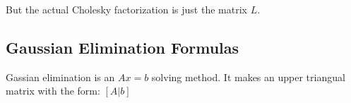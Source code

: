 But the actual Cholesky factorization is just the matrix $L$.

\subsection*{Gaussian Elimination Formulas}
Gassian elimination is an $Ax = b$ solving method. It makes an upper triangual matrix
with the form: $[A | b] $
\newline
\\~














